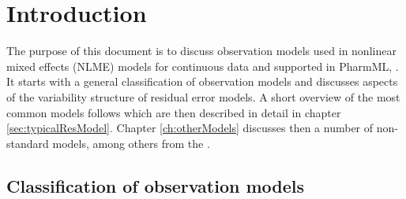 \chapter{Introduction}
\label{cht:intro}

The purpose of this document is to discuss observation models
used in nonlinear mixed effects (NLME) models for continuous data 
and supported in PharmML, \cite{Pharmml_06}. It starts with a 
general classification of observation models and discusses aspects of the 
variability structure of residual error models.
A short overview of the most common models follows which are then 
described in detail in chapter \ref{sec:typicalResModel}. Chapter \ref{ch:otherModels} 
discusses then a number of non-standard models, among others from the 
\cite{Keizer:2013aa}.


\section{Classification of observation models} %
\label{sec:modelClassific}

